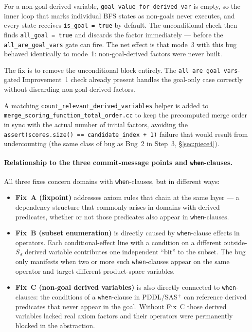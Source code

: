 \documentclass[11pt,a4paper]{article}
\begin{document}
For a non-goal-derived variable, \texttt{goal\_value\_for\_derived\_var} is
empty, so the inner loop that marks individual BFS states as non-goals never
executes, and every state receives \texttt{is\_goal = true} by default.  The
unconditional check then finds \texttt{all\_goal = true} and discards the
factor immediately --- before the \texttt{all\_are\_goal\_vars} gate can fire.
The net effect is that mode~3 with this bug behaved identically to mode~1:
non-goal-derived factors were never built.

The fix is to remove the unconditional block entirely.  The
\texttt{all\_are\_goal\_vars}-gated Improvement~1 check already present handles
the goal-only case correctly without discarding non-goal-derived factors.

A matching \texttt{count\_relevant\_derived\_variables} helper is added to
\texttt{merge\_scoring\_function\_total\_order.cc} to keep the precomputed
merge order in sync with the actual number of initial factors, avoiding the
\texttt{assert(scores.size() == candidate\_index + 1)} failure that would
result from undercounting (the same class of bug as Bug~2 in Step~3,
\S\ref{sec:piece4}).

\paragraph{Relationship to the three commit-message points and \texttt{when}-clauses.}
All three fixes concern domains with \texttt{when}-clauses, but in different
ways:

\begin{itemize}
  \item \textbf{Fix~A (fixpoint)} addresses axiom rules that chain at the
    same layer --- a dependency structure that commonly arises in domains
    with derived predicates, whether or not those predicates also appear in
    \texttt{when}-clauses.

  \item \textbf{Fix~B (subset enumeration)} is directly caused by
    \texttt{when}-clause effects in operators.  Each conditional-effect
    line with a condition on a different outside-$S_d$ derived variable
    contributes one independent ``bit'' to the subset.  The bug only
    manifests when two or more such \texttt{when}-clauses appear on the
    same operator and target different product-space variables.

  \item \textbf{Fix~C (non-goal derived variables)} is also directly
    connected to \texttt{when}-clauses: the conditions of a
    \texttt{when}-clause in PDDL/SAS$^+$ can reference derived predicates
    that never appear in the goal.  Without Fix~C those derived variables
    lacked real axiom factors and their operators were permanently blocked
    in the abstraction.
\end{itemize}
\end{document}
